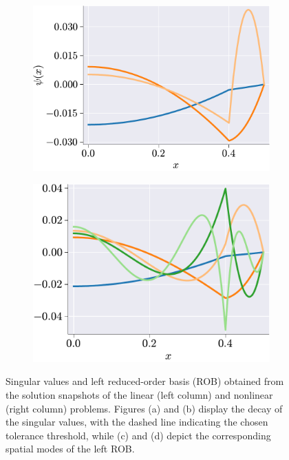 \documentclass[11pt]{article}
\begin{document}
\begin{figure}[t]
        \begin{subfigure}[b]{0.45\linewidth}
            \centering
            \includegraphics[width=\linewidth]{linear_Mode_shapes.pdf}
            \caption{}
            \label{fig:HC_ROM_c}
            \end
            {subfigure}
            \begin{subfigure}[b]{0.45\linewidth}
                \centering
                \includegraphics[width=0.96\linewidth]{nonlinear_Mode_shapes.pdf}
                \caption{}
                \label{fig:HC_ROM_d}
            \end{subfigure}
            \caption{Singular values and left reduced-order basis (ROB) obtained from the solution snapshots of  the linear (left column) and nonlinear (right column) problems.
            Figures (a) and (b) display the decay of the singular values, with the dashed line indicating the chosen tolerance threshold, while (c) and (d) depict the corresponding spatial modes of the left ROB.}
            \label{fig:HC_ROM}
        \end{figure}
\end{document}
